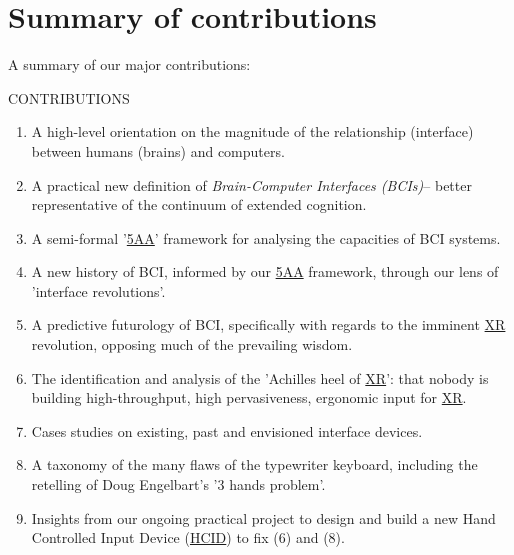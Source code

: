 \documentclass[logo,bsc,singlespacing,parskip]{infthesis}
\begin{document}
\chapter*{Summary of contributions}
\label{sec:orgaa4d7e6}
A summary of our major contributions:
\begin{mdframed}
\begin{description}
\item[{CONTRIBUTIONS}] 
\end{description}


\begin{enumerate}
\item A high-level orientation on the magnitude of the relationship (interface) between humans (brains) and computers.

\item A practical new definition of \emph{Brain-Computer Interfaces (BCIs)}--  better representative of the continuum of extended cognition.

\item A semi-formal '\hyperref[org2644eb5]{5AA}' framework for analysing the capacities of BCI systems.

\item A new history of BCI, informed by our \hyperref[org2644eb5]{5AA} framework, through our lens of 'interface revolutions'.

\item A predictive futurology of BCI, specifically with regards to the imminent \hyperref[org39cbd51]{XR} revolution, opposing much of the prevailing wisdom.

\item The identification and analysis of the 'Achilles heel of \hyperref[org39cbd51]{XR}': that nobody is building high-throughput, high pervasiveness, ergonomic input for \hyperref[org39cbd51]{XR}.

\item Cases studies on existing, past and envisioned interface devices.

\item A taxonomy of the many flaws of the typewriter keyboard, including the retelling of Doug Engelbart's '3 hands problem'.

\item Insights from our ongoing practical project to design and build a new Hand Controlled Input Device (\hyperref[org0c83164]{HCID}) to fix (6) and (8).
\end{enumerate}
\medskip
\end{mdframed}
\end{document}
